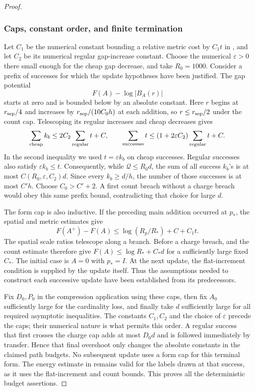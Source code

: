 \begin{proof}
\subsubsection*{Caps, constant order, and finite termination}
Let $C_1$ be the numerical constant bounding a relative metric cost
by $C_1t$ in , and let $C_2$ be its
numerical regular gap-increase constant.  Choose the numerical
$\varepsilon>0$ there small enough for the cheap gap decrease, and
take $R_0=1000$.  Consider a prefix of successes for which the update
hypotheses have been justified.  The gap potential
\[
 F(A)-\log|B_A(r)|
\]
starts at zero and is bounded below by an absolute constant.  Here
$r$ begins at $r_{\rm sep}/4$ and increases by
$r_{\rm sep}/(10C_0h)$ at each addition, so $r\le r_{\rm sep}/2$
under the count cap.  Telescoping its regular increases and cheap
decreases gives
\begin{equation}
 \sum_{\rm cheap}k_b\le
          2C_2\sum_{\rm regular}t+C,
 \qquad
 \sum_{\rm successes}t\le
       (1+2\varepsilon C_2)\sum_{\rm regular}t+C.
 \label{eq:06-gap-accounting}
\end{equation}
In the second inequality we used $t=\varepsilon k_b$ on cheap
successes.  Regular successes also satisfy $\varepsilon k_b\le t$.
Consequently, while $\mathcal Q\le R_0d$, the sum of all success
$k_b$'s is at most $C(R_0,\varepsilon,C_2)d$.  Since every
$k_b\ge d/h$, the number of those successes is at most $C'h$.
Choose $C_0>C'+2$.  A first count breach without a charge breach
would obey this same prefix bound, contradicting that choice for
large $d$.

The form cap is also inductive.  If the preceding main addition
occurred at $p_*$, the spatial and metric estimates give
\[
 F(A^+)-F(A)
       \le\log(R_p/R_*)+C+C_1t.
\]
The spatial scale ratios telescope along a branch.  Before a charge
breach,  and the count estimate therefore
give $F(A)\le\log R_*+C_*d$ for a sufficiently large fixed $C_*$.
The initial case is $A=0$ with $p_*=I$.  At the next update, the
flat-increment condition  is supplied by the update
itself.  Thus the assumptions needed to construct each successive
update have been established from its predecessors.

Fix $D_0,P_0$ in the compression application using these caps, then
fix $A_0$ sufficiently large for the cardinality loss, and finally
take $d$ sufficiently large for all required asymptotic inequalities.
The constants $C_1,C_2$ and the choice of $\varepsilon$ precede the
caps; their numerical nature is what permits this order.  A regular
success that first crosses the charge cap adds at most $D_0d$ and
is followed immediately by transfer.  Hence that final overshoot
only changes the absolute constants in the claimed path budgets.
No subsequent update uses a form cap for this terminal form.  The
energy estimate in  remains valid for the labels
drawn at that success, as it uses the flat-increment and count bounds.
This proves all the deterministic budget assertions.


\end{proof}
